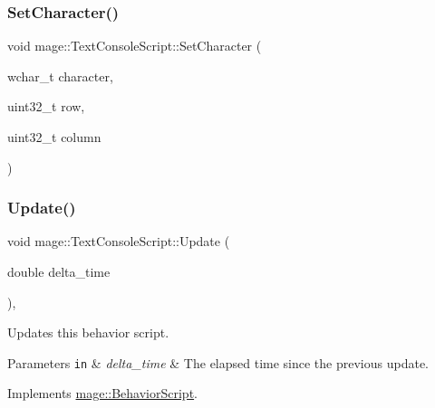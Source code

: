 \hypertarget{classmage_1_1_text_console_script_a08324571bfbe793eafedc22126e575b9}{}\label{classmage_1_1_text_console_script_a08324571bfbe793eafedc22126e575b9} 
\subsubsection{\texorpdfstring{Set\+Character()}{SetCharacter()}}
{\footnotesize\ttfamily void mage\+::\+Text\+Console\+Script\+::\+Set\+Character (\begin{DoxyParamCaption}\item[{wchar\+\_\+t}]{character,  }\item[{uint32\+\_\+t}]{row,  }\item[{uint32\+\_\+t}]{column }\end{DoxyParamCaption})\hspace{0.3cm}{\ttfamily [private]}}

\hypertarget{classmage_1_1_text_console_script_a7b1acbf48376b650c08fa941a63ffa98}{}\label{classmage_1_1_text_console_script_a7b1acbf48376b650c08fa941a63ffa98} 
\subsubsection{\texorpdfstring{Update()}{Update()}}
{\footnotesize\ttfamily void mage\+::\+Text\+Console\+Script\+::\+Update (\begin{DoxyParamCaption}\item[{double}]{delta\+\_\+time }\end{DoxyParamCaption})\hspace{0.3cm}{\ttfamily [override]}, {\ttfamily [virtual]}}

Updates this behavior script.


\begin{DoxyParams}[1]{Parameters}
\mbox{\tt in}  & {\em delta\+\_\+time} & The elapsed time since the previous update. \\
\hline
\end{DoxyParams}


Implements \hyperlink{classmage_1_1_behavior_script_a905b6c83640cb91d19fecab3435f6feb}{mage\+::\+Behavior\+Script}.

